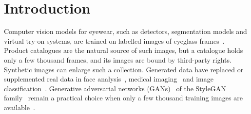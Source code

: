 \documentclass[electronics,article,submit,pdftex,moreauthors]{Definitions/mdpi}
\begin{document}



\section{Introduction}
\label{sec:intro}

Computer vision models for eyewear, such as detectors, segmentation models
and virtual try-on systems, are trained on labelled images of eyeglass
frames~\cite{giedra2025deploying,matuzevicius2024retrospective,matuzevicius2024diverse}.
Product catalogues are the natural source of such images, but a catalogue
holds only a few thousand frames, and its images are bound by third-party
rights. Synthetic images can enlarge such a collection. Generated data have
replaced or supplemented real data in face analysis~\cite{wood2021fakeit},
medical imaging~\cite{fridadar2018liver} and image
classification~\cite{besnier2020thisdataset}. Generative adversarial networks
(GANs)~\cite{goodfellow2014gan} of the StyleGAN
family~\cite{karras2019stylegan,karras2020stylegan2} remain a practical choice
when only a few thousand training images are available~\cite{karras2020ada}.
\end{document}
